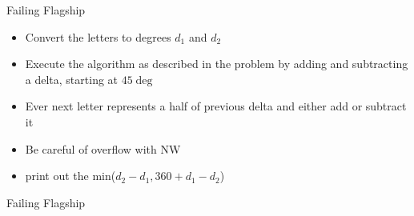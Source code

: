 \documentclass[11pt,pdf, aspectratio=169]{beamer}
\begin{document}
  \begin{frame}{Failing Flagship}
    \begin{itemize}
      \item Convert the letters to degrees $d_1$ and $d_2$
      \item Execute the algorithm as described in the problem by adding and subtracting a delta, starting at $45\deg$
      \item Ever next letter represents a half of previous delta and either add or subtract it
      \item Be careful of overflow with NW
      \item print out the min($d_2-d_1, 360+d_1-d_2$)
    \end{itemize}
  \end{frame}
  \begin{frame}[containsverbatim]{Failing Flagship}
    \inputminted{python}{code/session-1/python/bapc-f.py}
  \end{frame}
\end{document}
